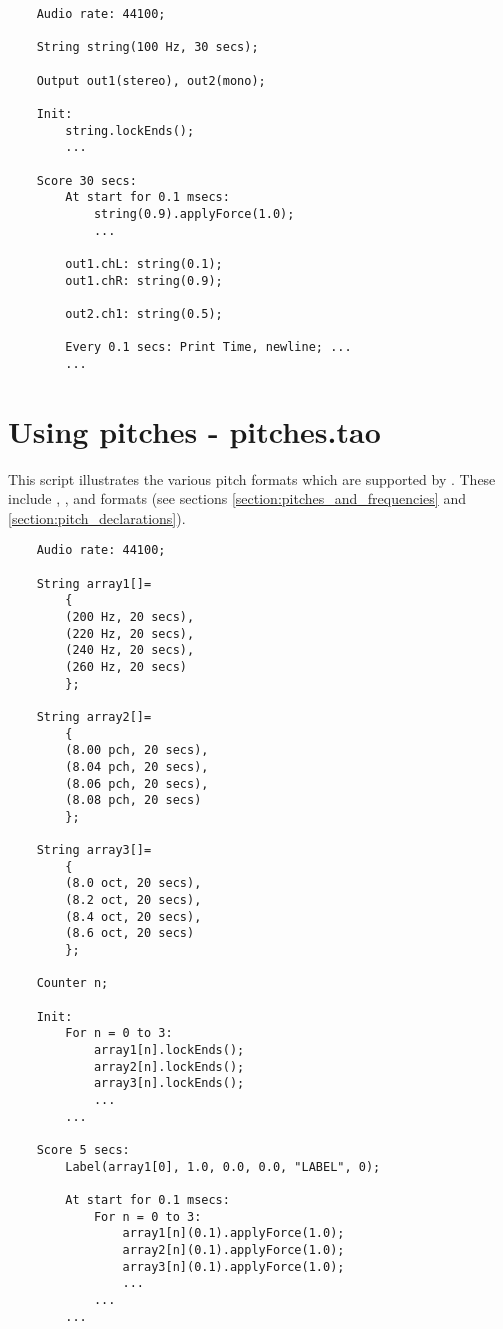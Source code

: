 \begin{verbatim}
    Audio rate: 44100;
        
    String string(100 Hz, 30 secs);
        
    Output out1(stereo), out2(mono);
        
    Init:
        string.lockEnds();
        ...
        
    Score 30 secs:
        At start for 0.1 msecs:
            string(0.9).applyForce(1.0);
            ...
            
        out1.chL: string(0.1);
        out1.chR: string(0.9);
        
        out2.ch1: string(0.5);
        
        Every 0.1 secs: Print Time, newline; ...
        ...
\end{verbatim}
     
\section{Using pitches - pitches.tao}
This script illustrates the various pitch formats which are supported
by \tao. These include , ,  and
 formats (see sections \ref{section:pitches_and_frequencies}
and \ref{section:pitch_declarations}).

\begin{verbatim}
    Audio rate: 44100;
        
    String array1[]=
        {
        (200 Hz, 20 secs),
        (220 Hz, 20 secs),
        (240 Hz, 20 secs),
        (260 Hz, 20 secs)
        };
        
    String array2[]=
        {
        (8.00 pch, 20 secs),
        (8.04 pch, 20 secs),
        (8.06 pch, 20 secs),
        (8.08 pch, 20 secs)
        };
        
    String array3[]=
        {
        (8.0 oct, 20 secs),
        (8.2 oct, 20 secs),
        (8.4 oct, 20 secs),
        (8.6 oct, 20 secs)
        };
        
    Counter n;
        
    Init:
        For n = 0 to 3:
            array1[n].lockEnds();
            array2[n].lockEnds();
            array3[n].lockEnds();
            ...
        ...
        
    Score 5 secs:
        Label(array1[0], 1.0, 0.0, 0.0, "LABEL", 0);
        
        At start for 0.1 msecs:
            For n = 0 to 3:
                array1[n](0.1).applyForce(1.0);
                array2[n](0.1).applyForce(1.0);
                array3[n](0.1).applyForce(1.0);
                ...
            ...
        ...
\end{verbatim}
 
